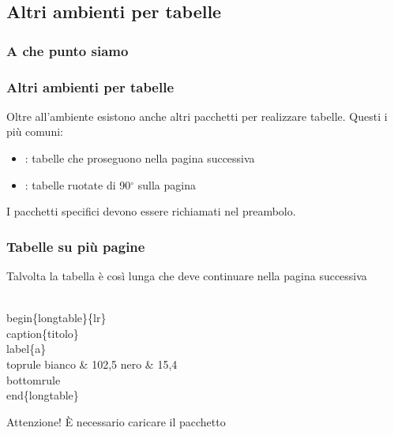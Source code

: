 \documentclass[svgnames,%
	ucs,%
	pdftex]{guitbeamer}
\begin{document}
\subsection{Altri ambienti per tabelle}
\begin{frame}
  \frametitle{A che punto siamo}
\end{frame}
\begin{frame}
  \frametitle{Altri ambienti per tabelle}
	Oltre all'ambiente  esistono anche altri pacchetti per realizzare tabelle. Questi i pi\`u comuni:
	\begin{itemize}
		\item {}: tabelle che proseguono nella pagina successiva
		\item {}: tabelle ruotate di 90$^{\circ}$ sulla pagina
	\end{itemize}
	I pacchetti specifici devono essere richiamati nel preambolo.
\end{frame}
\begin{frame}
  \frametitle{Tabelle su pi\`u pagine}
	Talvolta la tabella \`e cos\`i lunga che deve continuare nella pagina successiva
	\begin{LaTeXcode}
		\alert{\\begin\{longtable\}\{lr\}}\n
		\\caption\{titolo\}\\label\{a\}\
		\\toprule\n
		\hspace*{5ex}bianco \& 102,5 \bs\bs\n
		\hspace*{5ex}nero   \& 15,4 \bs\bs\
		\\bottomrule\n
		\alert{\\end\{longtable\}}
	\end{LaTeXcode}
	\begin{block}{Attenzione!}
		\`E necessario caricare il pacchetto 
	\end{block}
\end{frame}
\end{document}
